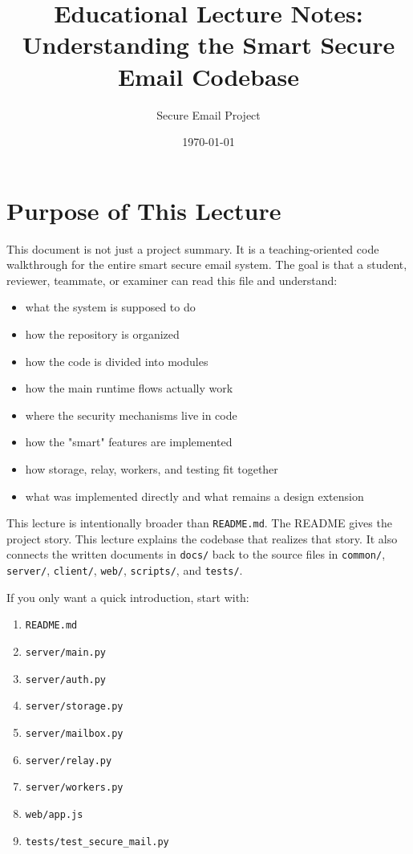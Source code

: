 \documentclass[11pt,a4paper]{article}
\title{Educational Lecture Notes: Understanding the Smart Secure Email Codebase}
\author{Secure Email Project}
\date{\today}
\begin{document}
\maketitle
\tableofcontents
\newpage
\section{Purpose of This Lecture}

This document is not just a project summary. It is a teaching-oriented code walkthrough for the entire smart secure email system. The goal is that a student, reviewer, teammate, or examiner can read this file and understand:

\begin{itemize}
\item what the system is supposed to do
\item how the repository is organized
\item how the code is divided into modules
\item how the main runtime flows actually work
\item where the security mechanisms live in code
\item how the "smart" features are implemented
\item how storage, relay, workers, and testing fit together
\item what was implemented directly and what remains a design extension
\end{itemize}

This lecture is intentionally broader than \nolinkurl{README.md}. The README gives the project story. This lecture explains the codebase that realizes that story. It also connects the written documents in \nolinkurl{docs/} back to the source files in \nolinkurl{common/}, \nolinkurl{server/}, \nolinkurl{client/}, \nolinkurl{web/}, \nolinkurl{scripts/}, and \nolinkurl{tests/}.

If you only want a quick introduction, start with:

\begin{enumerate}
\item \nolinkurl{README.md}
\item \nolinkurl{server/main.py}
\item \nolinkurl{server/auth.py}
\item \nolinkurl{server/storage.py}
\item \nolinkurl{server/mailbox.py}
\item \nolinkurl{server/relay.py}
\item \nolinkurl{server/workers.py}
\item \nolinkurl{web/app.js}
\item \nolinkurl{tests/test_secure_mail.py}
\end{enumerate}
\end{document}
